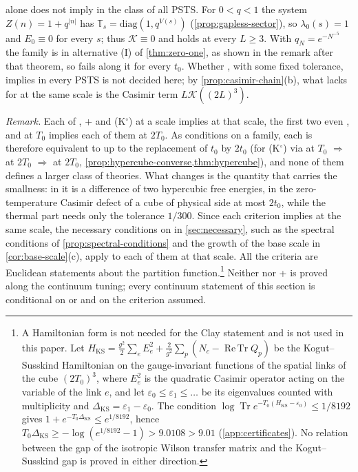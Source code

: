 \documentclass[11pt,a4paper]{amsart}
\theoremstyle{definition}
\theoremstyle{remark}
\numberwithin{equation}{section}
\DeclareMathOperator{\Tr}{Tr}        %
\DeclareMathOperator{\ReTr}{Re\,Tr}  %
\newcommand{\PSTS}{\textup{PSTS}}          %
\newcommand{\TT}{\mathbb{T}}               %
\newcommand{\Vol}[1]{V(#1)}                %
\newcommand{\cube}[1]{(2#1)^3}             %
\newcommand{\lzero}{\lambda_0}             %
\newcommand{\xconst}{\frac{1}{8192}}       %
\newcommand{\xconstinl}{1/8192}            %
\newcommand{\Mcirc}{\text{\upshape(M$^{\circ}$)}}   %
\newcommand{\Bcirc}{\text{\upshape(B$^{\circ}$)}}   %
\newcommand{\Hcirc}{\text{\upshape(H$^{\circ}$)}}   %
\newcommand{\hypW}{\text{\upshape(W)}}              %
\newcommand{\UVB}{\text{\upshape(UVB)}}             %
\newcommand{\Kone}{\text{\upshape(K1)}}             %
\newcommand{\Ktwo}{\text{\upshape(K2)}}             %
\newcommand{\tzero}{t_0}                   %
\begin{document}
\Kone{} alone does not imply \Mcirc{} in the class of all \PSTS{}. For $0<q<1$ the system $Z(n)=1+q^{|n|}$ has $\TT_s=\mathrm{diag}(1,q^{\Vol{s}})$ (\cref{prop:gapless-sector}), so $\lzero(s)=1$ and $E_0\equiv0$ for every $s$; thus $\mathcal K\equiv0$ and \Kone{} holds at every $L\ge3$. With $q_N=e^{-N^{-5}}$ the family is in alternative (I) of \cref{thm:zero-one}, as shown in the remark after that theorem, so \Mcirc{} fails along it for every $\tzero$. Whether \Ktwo{}, with some fixed tolerance, implies \Mcirc{} in every \PSTS{} is not decided here; by \cref{prop:casimir-chain}(b), what \Ktwo{} lacks for \Bcirc{} at the same scale is the Casimir term $L\mathcal K(\cube{L})$.

\smallskip
\noindent\emph{Remark.} Each of \Hcirc, \Kone+\Ktwo{} and \textup{(K$^\circ$)} at a scale implies \Bcirc{} at that scale, the first two even \Mcirc, and \Bcirc{} at $T_0$ implies each of them at $2T_0$. As conditions on a family, each is therefore equivalent to \Mcirc{} up to the replacement of $\tzero$ by $2\tzero$ (for \textup{(K$^\circ$)} via \Bcirc{} at $T_0$ $\Rightarrow$ \Hcirc{} at $2T_0$ $\Rightarrow$ \Mcirc{} at $2T_0$, \cref{prop:hypercube-converse,thm:hypercube}), and none of them defines a larger class of theories. What changes is the quantity that carries the smallness: in \Hcirc{} it is a difference of two hypercubic free energies, in \Kone{} the zero-temperature Casimir defect of a cube of physical side at most $2\tzero$, while the thermal part \Ktwo{} needs only the tolerance $1/300$. Since each criterion implies \Bcirc{} at the same scale, the necessary conditions on \Bcirc{} in \cref{sec:necessary}, such as the spectral conditions of \cref{prop:spectral-conditions} and the growth of the base scale in \cref{cor:base-scale}(c), apply to each of them at that scale. All the criteria are Euclidean statements about the partition function.\footnote{A Hamiltonian form is not needed for the Clay statement and is not used in this paper. Let $H_{\mathrm{KS}}=\frac{g^2}{2}\sum_eE_e^2+\frac{2}{g^2}\sum_p(N_c-\ReTr Q_p)$ be the Kogut--Susskind Hamiltonian \cite{kogut1975} on the gauge-invariant functions of the spatial links of the cube $\cube{T_0}$, where $E_e^2$ is the quadratic Casimir operator acting on the variable of the link $e$, and let $\varepsilon_0\le\varepsilon_1\le\dots$ be its eigenvalues counted with multiplicity and $\Delta_{\mathrm{KS}}=\varepsilon_1-\varepsilon_0$. The condition $\log\Tr e^{-T_0(H_{\mathrm{KS}}-\varepsilon_0)}\le\xconstinl$ gives $1+e^{-T_0\Delta_{\mathrm{KS}}}\le e^{\xconstinl}$, hence $T_0\Delta_{\mathrm{KS}}\ge-\log(e^{\xconstinl}-1)>9.0108>9.01$ (\cref{app:certificates}). No relation between the gap of the isotropic Wilson transfer matrix and the Kogut--Susskind gap is proved in either direction.\label{fn:kogut-susskind}} Neither \Hcirc{} nor \Kone+\Ktwo{} is proved along the continuum tuning; every continuum statement of this section is conditional on \UVB{} or \hypW{} and on the criterion assumed.
\end{document}
